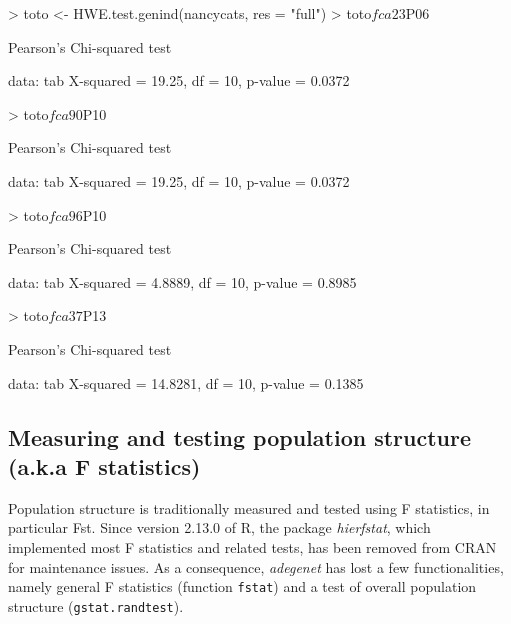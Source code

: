 \documentclass{article}
\begin{document}
\begin{Schunk}
\begin{Sinput}
> toto <- HWE.test.genind(nancycats, res = "full")
> toto$fca23$P06
\end{Sinput}
\begin{Soutput}
	Pearson's Chi-squared test

data:  tab 
X-squared = 19.25, df = 10, p-value = 0.0372
\end{Soutput}
\begin{Sinput}
> toto$fca90$P10
\end{Sinput}
\begin{Soutput}
	Pearson's Chi-squared test

data:  tab 
X-squared = 19.25, df = 10, p-value = 0.0372
\end{Soutput}
\begin{Sinput}
> toto$fca96$P10
\end{Sinput}
\begin{Soutput}
	Pearson's Chi-squared test

data:  tab 
X-squared = 4.8889, df = 10, p-value = 0.8985
\end{Soutput}
\begin{Sinput}
> toto$fca37$P13
\end{Sinput}
\begin{Soutput}
	Pearson's Chi-squared test

data:  tab 
X-squared = 14.8281, df = 10, p-value = 0.1385
\end{Soutput}
\end{Schunk}





\subsection{Measuring and testing population structure (a.k.a F statistics)}
Population structure is traditionally measured and tested using F statistics, in particular Fst.
Since version 2.13.0 of R, the package \emph{hierfstat}, which implemented most F statistics and
related tests, has been removed from CRAN for maintenance issues.
As a consequence, \emph{adegenet} has lost a few functionalities, namely general F statistics
(function \texttt{fstat}) and a test of overall population structure (\texttt{gstat.randtest}).
\\
\end{document}
